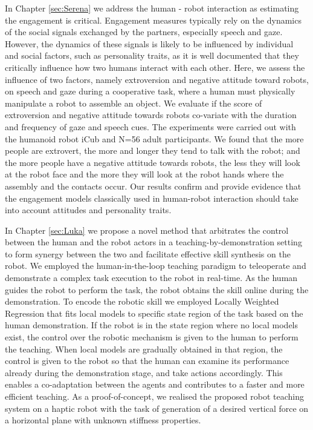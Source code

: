 \documentclass[12pt,a4paper,twoside]{report}
\begin{document}
In Chapter \ref{sec:Serena} we address the human - robot interaction as estimating the engagement is critical. Engagement measures typically rely on the dynamics of the social signals exchanged by the partners, especially speech and gaze. However, the dynamics of these signals is likely to be influenced by individual and social factors, such as personality traits, as it is well documented that they critically influence how two humans interact with each other. Here, we assess the influence of two factors, namely extroversion and negative attitude toward robots, on speech and gaze during a cooperative task, where a human must physically manipulate a robot to assemble an object. We evaluate if the score of extroversion and negative attitude towards robots co-variate with the duration and frequency of gaze and speech cues. The experiments were carried out with the humanoid robot iCub and N=56 adult participants. We found that the more people are extrovert, the more and longer they tend to talk with the robot; and the more people have a negative attitude towards robots, the less they will look at the robot face and the more they will look at the robot hands where the assembly and the contacts occur. Our results confirm and provide evidence that the engagement models classically used in human-robot interaction should take into account attitudes and personality traits.
\bigskip

In Chapter \ref{sec:Luka} we propose a novel method that arbitrates the control between the human and the robot actors in a teaching-by-demonstration setting to form synergy between the two and facilitate effective skill synthesis on the robot. We employed the human-in-the-loop teaching paradigm to teleoperate and demonstrate a complex task execution to the robot in real-time. As the human guides the robot to perform the task, the robot obtains the skill online during the demonstration. To encode the robotic skill we employed Locally Weighted Regression that fits local models to specific state region of the task based on the human demonstration. If the robot is in the state region where no local models exist, the control over the robotic mechanism is given to the human to perform the teaching. When local models are gradually obtained in that region, the control is given to the robot so that the human can examine its performance already during the demonstration stage, and take actions accordingly. This enables a co-adaptation between the agents and contributes to a faster and more efficient teaching. As a proof-of-concept, we realised the proposed robot teaching system on a haptic robot with the task of generation of a desired vertical force on a horizontal plane with unknown stiffness properties.
\bigskip
\end{document}
